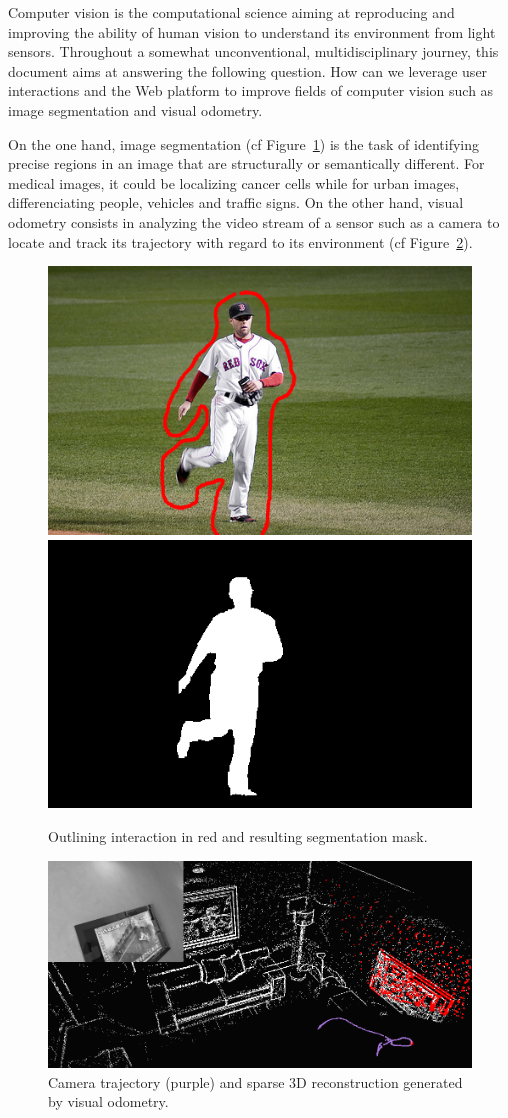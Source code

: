 Computer vision is the computational science aiming at reproducing and improving
the ability of human vision to understand its environment from light sensors.
Throughout a somewhat unconventional, multidisciplinary journey,
this document aims at answering the following question.
How can we leverage user interactions and the Web platform to improve
fields of computer vision such as image segmentation and visual odometry.

On the one hand, image segmentation (cf Figure~\ref{fig:segmentation})
is the task of identifying precise regions
in an image that are structurally or semantically different.
For medical images, it could be localizing cancer cells while
for urban images, differenciating people, vehicles and traffic signs.
On the other hand, visual odometry consists in analyzing the video stream of a sensor
such as a camera to locate and track its trajectory with regard to its environment
(cf Figure~\ref{fig:visual-odometry}).

\begin{figure}[h]
	\centering
	\includegraphics[width=0.45\linewidth]{assets/img/segmentation-interaction.png}
	\hfill
	\includegraphics[width=0.45\linewidth]{assets/img/segmentation-mask.png}
	\caption{Outlining interaction in red and resulting segmentation mask.}%
	\label{fig:segmentation}
\end{figure}

\begin{figure}[h]
	\centering
	\includegraphics[width=\linewidth]{assets/img/visual-odometry.png}
	\caption{Camera trajectory (purple) and sparse 3D reconstruction
	generated by visual odometry.}%
	\label{fig:visual-odometry}
\end{figure}

